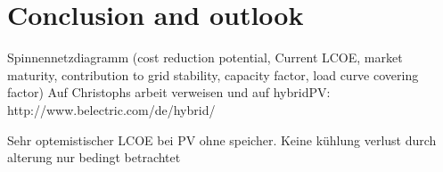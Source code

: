 \chapter{Conclusion and outlook}
Spinnennetzdiagramm (cost reduction potential, Current LCOE, market maturity, contribution to grid stability, capacity factor, load curve covering factor)
Auf Christophs arbeit verweisen und auf hybridPV:
http://www.belectric.com/de/hybrid/

Sehr optemistischer LCOE bei PV ohne speicher.
Keine kühlung 
verlust durch alterung nur bedingt betrachtet
%
%
\clearpage

